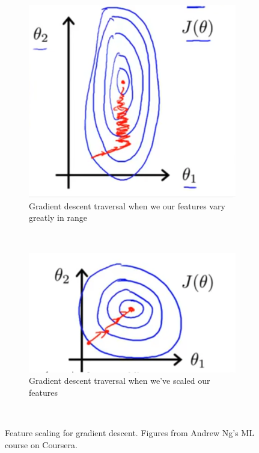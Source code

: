 \documentclass[11pt]{article}
\begin{document}
    
    \begin{figure}
    \centering
    \begin{subfigure}[b]{0.3\textwidth}
        \includegraphics[width=\textwidth]{squashed}
        \caption{Gradient descent traversal when we our features vary greatly in range}
        \label{fig:squashed}
    \end{subfigure}
    ~ %
    \begin{subfigure}[b]{0.3\textwidth}
        \includegraphics[width=\textwidth]{scaled}
        \caption{Gradient descent traversal when we've scaled our features}
        \label{fig:scaled}
    \end{subfigure}
    ~ %
    \caption{Feature scaling for gradient descent. Figures from Andrew Ng's ML course on Coursera.}\label{fig:feature-scaling}
\end{figure}
    
\end{document}
